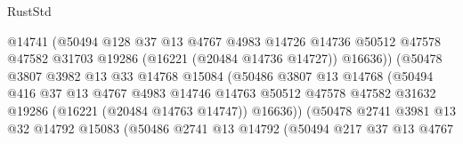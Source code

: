 \begin{lexlean}{RustStd}
\begin{coremodule}
                                    @14741
                                    (@50494
                                      @128
                                      @37
                                      @13
                                      @4767
                                      @4983
                                      @14726
                                      @14736
                                      @50512
                                      @47578
                                      @47582
                                      @31703
                                      @19286
                                      (@16221 (@20484 @14736 @14727))
                                      @16636))
                                  (@50478
                                    @3807
                                    @3982
                                    @13
                                    @33
                                    @14768
                                    @15084
                                    (@50486
                                      @3807
                                      @13
                                      @14768
                                      (@50494
                                        @416
                                        @37
                                        @13
                                        @4767
                                        @4983
                                        @14746
                                        @14763
                                        @50512
                                        @47578
                                        @47582
                                        @31632
                                        @19286
                                        (@16221 (@20484 @14763 @14747))
                                        @16636))
                                    (@50478
                                      @2741
                                      @3981
                                      @13
                                      @32
                                      @14792
                                      @15083
                                      (@50486
                                        @2741
                                        @13
                                        @14792
                                        (@50494
                                          @217
                                          @37
                                          @13
                                          @4767

\end{coremodule}
\end{lexlean}
